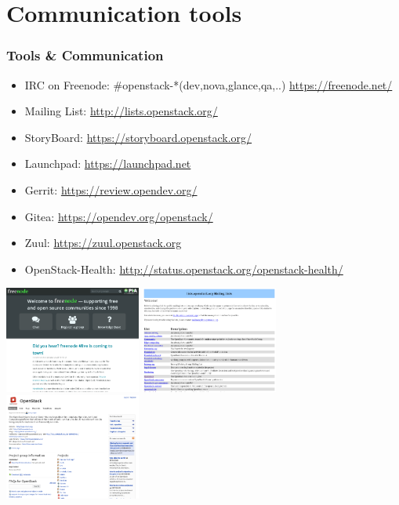 \documentclass[aspectratio=169,11pt,hyperref={colorlinks=true}]{beamer}
\begin{document}
\section{Communication tools}
\begin{frame}
  \frametitle{Tools \& Communication}
  \begin{itemize}
    \item IRC on Freenode: \#openstack-*(dev,nova,glance,qa,..) \url{https://freenode.net/}
    \item Mailing List: \url{http://lists.openstack.org/}
    \item StoryBoard: \url{https://storyboard.openstack.org/}
    \item Launchpad: \url{https://launchpad.net}
    \item Gerrit: \url{https://review.opendev.org/}
    \item Gitea: \url{https://opendev.org/openstack/}
    \item Zuul: \url{https://zuul.openstack.org}
    \item OpenStack-Health: \url{http://status.openstack.org/openstack-health/}
  \end{itemize}
  \centering
  \includegraphics[height=35mm]{images/freenode.png}
  \includegraphics[height=35mm]{images/openstack-ml.png}
  \includegraphics[height=35mm]{images/openstack-in-launchpad.png}
\end{frame}
\end{document}
